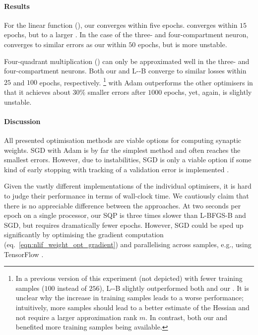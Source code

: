 \paragraph{Results}
For the linear function (), our \SQP converges within five epochs. \BFGS converges within $15$ epochs, but to a larger \NRMSE.
In the case of the three- and four-compartment neuron, \SGD converges to similar errors as our \SQP within $50$ epochs, but is more unstable.

Four-quadrant multiplication () can only be approximated well in the three- and four-compartment neurons.
Both our \SQP and L-\BFGS-B converge to similar losses within $25$ and $100$ epochs, respectively.%
\footnote{In a previous version of this experiment (not depicted) with fewer training samples ($100$ instead of $256$), L-\BFGS-B slightly outperformed both \SGD and our \SQP.
It is unclear why the increase in training samples leads to a worse performance; intuitively, more samples should lead to a better estimate of the Hessian and not require a larger approximation rank $m$.
In contrast, both our \SQP and \SGD benefited more training samples being available.
}
\SGD with Adam outperforms the other optimisers in that it achieves about $30\%$ smaller errors after $1000$ epochs, yet, again, is slightly unstable.

\paragraph{Discussion}
All presented optimisation methods are viable options for computing synaptic weights.
SGD with Adam is by far the simplest method and often reaches the smallest errors.
However, due to instabilities, SGD is only a viable option if some kind of early stopping with tracking of a validation error is implemented \citep[e.g.,][Section~7.1]{goodfellow2016deep}.

Given the vastly different implementations of the individual optimisers, it is hard to judge their performance in terms of wall-clock time.
We cautiously claim that there is no appreciable difference between the approaches.
At two seconds per epoch on a single processor, our SQP is three times slower than L-BFGS-B and SGD, but requires dramatically fewer epochs.
However, SGD could be sped up significantly by optimising the gradient computation (eq.~\ref{eqn:nlif_weight_opt_gradient}) and parallelising across samples, e.g., using TensorFlow \citep{abadi2016tensorflow}.

